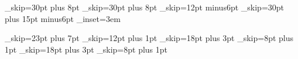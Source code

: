 
\aboveauthors_skip=30pt plus 8pt
\belowauthors_skip=30pt plus 8pt
\belowabs_skip=12pt minus6pt
\belowkw_skip=30pt plus 15pt minus6pt
\abs_inset=3em

\def\report{%
    \foot_count=0 \auth_count=0
    \let\short_title=\empty
    \title_pagetrue}

\def\endReport{\vfill\end}

\def\title#1{\titl@={#1}%
    \setbox\title_box=\vbox{%
    \leftskip=3em plus 1fill \rightskip=3em plus 1fill
    \parfillskip=0pt
    \titleFont\noindent\the\titl@\par}}

\def\shortTitle#1{\def\short_title{#1}}

\def\author#1{\ifnum\auth_count=0
        \@uthors={#1}\def\first_author{#1}\else
        \@uthors=\expandafter{\the\@uthors, #1}\fi
    \incr\auth_count}

\def\makeTitle{\edef\the_title{\the\titl@}%
    \leftRunHead={{\x_i\folio}\kern2em{\x_sc\ifnum\auth_count>3
        \first_author~et~al.\else \the\@uthors\fi}}%
    \rightRunHead={{\petit\ifx\short_title\empty
        \it\the\titl@\else\short_title\fi\kern2em$\x_i\folio$}}%
    \box\title_box
    \vskip\aboveauthors_skip
    \vbox{\leftskip=3em plus 1fill \rightskip=3em plus 1fill
    \parfillskip=0pt
    \normalSize\noindent\sc\the\@uthors}
    \vskip\belowauthors_skip}

\def\abstract{\bgroup\petit
    \centerline{\bf Abstract}
    \advance\leftskip by \abs_inset
    \advance\hsize by -\abs_inset}

\def\endAbstract{\par\egroup\vskip\belowabs_skip}

\def\keywords#1{\vbox{
    \advance\leftskip by \abs_inset
    \advance\hsize by -\abs_inset
    \petit\noindent
    {\sl Keywords:} #1\par}
    \vskip\belowkw_skip}

\abovesec_skip=23pt plus 7pt
\belowsec_skip=12pt plus 1pt
\abovesubsec_skip=18pt plus 3pt
\belowsubsec_skip=8pt plus 1pt
\abovesss_skip=18pt plus 3pt
\belowsss_skip=8pt plus 1pt

\def\set_heading_box#1#2#3#4#5{\setbox0=\hbox{#2#3}%
    \setbox0=\vbox{#2%
        \skip0=#1
        \vskip \ifx\par\endgraf \else .5\fi\skip0
        \hangindent=\wd0
        \hangafter=1 \parskip=0pt
        \hyphenpenalty=10000 \rightskip=0pt plus 5em
        \noindent#3#4\par\nobreak\vskip#5}}

